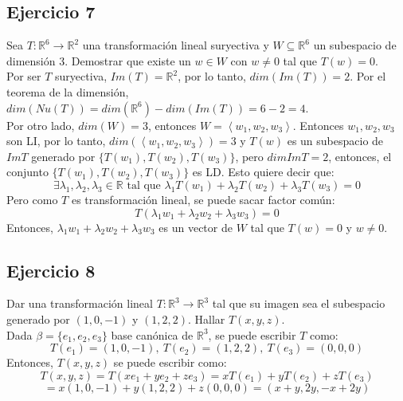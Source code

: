 \documentclass[a4paper,12pt]{article}
\begin{document}
\subsection{Ejercicio 7}
Sea $T:\mathds{R}^6\rightarrow\mathds{R}^2$ una transformación lineal suryectiva y $W\subseteq \mathds{R}^6$ un subespacio de dimensión 3. Demostrar que existe un $w\in W$ con $w\neq 0$ tal que $T(w)=0$. \\
Por ser $T$ suryectiva, $Im(T)=\mathds{R}^2$, por lo tanto, $dim(Im(T))=2$. Por el teorema de la dimensión, $dim(Nu(T))=dim(\mathds{R}^6)-dim(Im(T))=6-2=4$. \\
Por otro lado, $dim(W)=3$, entonces $W=\left \langle w_1,w_2,w_3 \right \rangle$. Entonces $w_1,w_2,w_3$ son LI, por lo tanto, $dim(\left \langle w_1,w_2,w_3 \right \rangle)=3$ y $T(w)$ es un subespacio de $ImT$ generado por $\{ T(w_1), T(w_2), T(w_3) \}$, pero $dimImT=2$, entonces, el conjunto $\{ T(w_1), T(w_2), T(w_3) \}$ es LD. Esto quiere decir que: \\
$$
\exists \lambda_1,\lambda_2,\lambda_3 \in \mathds{R} \text{ tal que } \lambda_1T(w_1)+\lambda_2T(w_2)+\lambda_3T(w_3)=0
$$
Pero como $T$ es transformación lineal, se puede sacar factor común:
$$
T(\lambda_1w_1+\lambda_2w_2+\lambda_3w_3)=0
$$
Entonces, $\lambda_1w_1+\lambda_2w_2+\lambda_3w_3$ es un vector de $W$ tal que $T(w)=0$ y $w\neq 0$.
\subsection{Ejercicio 8}
Dar una transformación lineal $T:\mathds{R}^3\rightarrow\mathds{R}^3$ tal que su imagen sea el subespacio generado por $(1,0,-1)$ y $(1,2,2)$. Hallar $T(x,y,z)$. \\
Dada $\beta = \{ e_1,e_2,e_3 \}$ base canónica de $\mathds{R}^3$, se puede escribir $T$ como:
$$
T(e_1)=(1,0,-1), \ T(e_2)=(1,2,2), \ T(e_3)=(0,0,0)
$$
Entonces, $T(x,y,z)$ se puede escribir como:
$$
T(x,y,z)=T(xe_1+ye_2+ze_3)=xT(e_1)+yT(e_2)+zT(e_3)
$$
$$
=x(1,0,-1)+y(1,2,2)+z(0,0,0)=(x+y,2y,-x+2y)
$$
\end{document}
